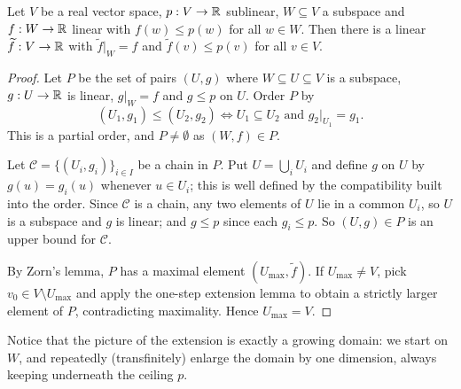 \documentclass[a4paper]{scrartcl}
\newcommand{\wt}{\widetilde}
\begin{document}
\begin{theorem}
	Let $V$ be a real vector space, $p : V \to \mathbb{R}$ sublinear, $W \subseteq V$ a subspace and $f : W \to \mathbb{R}$ linear with $f(w) \leq p(w)$ for all $w \in W$. Then there is a linear $\wt f : V \to \R$ with $\wt f|_W = f$ and $\wt f(v) \leq p(v)$ for all $v \in V$.
\end{theorem}

\begin{proof}
	Let $P$ be the set of pairs $(U, g)$ where $W \subseteq U \subseteq V$ is a subspace, $g : U \to \mathbb{R}$ is linear, $g|_W = f$ and $g \leq p$ on $U$. Order $P$ by
	$$(U_1, g_1) \leq (U_2, g_2) \iff U_1 \subseteq U_2 \text{ and } g_2|_{U_1} = g_1.$$
	This is a partial order, and $P \neq \emptyset$ as $(W, f) \in P$.

	Let $\mathcal{C} = \{(U_i, g_i)\}_{i \in I}$ be a chain in $P$. Put $U = \bigcup_i U_i$ and define $g$ on $U$ by $g(u) = g_i(u)$ whenever $u \in U_i$; this is well defined by the compatibility built into the order. Since $\mathcal C$ is a chain, any two elements of $U$ lie in a common $U_i$, so $U$ is a subspace and $g$ is linear; and $g \leq p$ since each $g_i \leq p$. So $(U,g) \in P$ is an upper bound for $\mathcal{C}$.

	By Zorn's lemma, $P$ has a maximal element $(U_{\max}, \wt f)$. If $U_{\max} \neq V$, pick $v_0 \in V \setminus U_{\max}$ and apply the one-step extension lemma to obtain a strictly larger element of $P$, contradicting maximality. Hence $U_{\max} = V$.
\end{proof}

Notice that the picture of the extension is exactly a growing domain: we start on $W$, and repeatedly (transfinitely) enlarge the domain by one dimension, always keeping underneath the ceiling $p$.

\begin{center}
\end{center}
\end{document}
